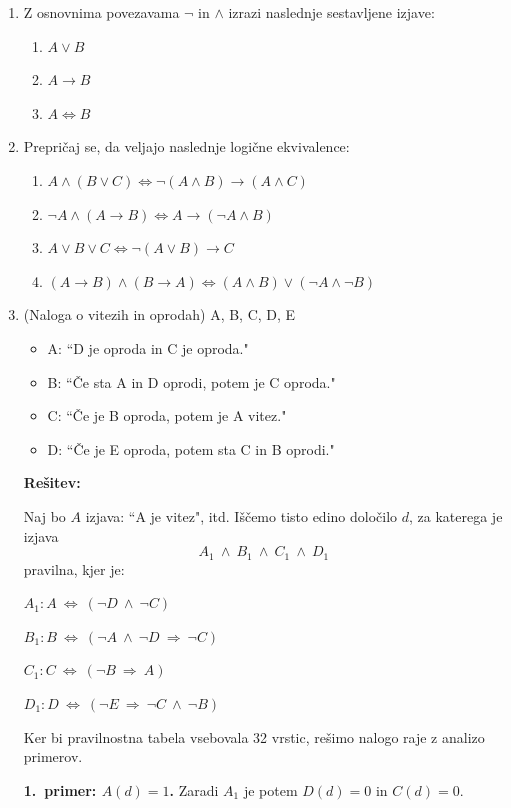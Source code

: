 \documentclass[11pt,paper=b5,DIV=13,headinclude,footinclude]{scrbook}
\def\inn {{~\wedge~}}
\def\sledi {{~\Rightarrow~}}
\def\cee {{~\Leftrightarrow~}}
\begin{document}
\begin{enumerate}
\item Z osnovnima povezavama $\neg$ in $\land$ izrazi naslednje sestavljene izjave:
\begin{enumerate}
  \item $A \lor B$
  \item $A \rightarrow B$
  \item $A \iff B$
\end{enumerate}

\item Prepričaj se, da veljajo naslednje logične ekvivalence:
\begin{enumerate}
  \item $A \land (B \lor C) \iff \neg (A \land B) \rightarrow (A \land C)$
  \item $\neg A \land (A \rightarrow B) \iff A \rightarrow (\neg A \land B)$
  \item $A \lor B \lor C \iff \neg (A \lor B) \rightarrow C$
  \item $(A \rightarrow B) \land (B \rightarrow A) \iff (A \land B) \lor (\neg A \land \neg B)$
\end{enumerate}

    \item 
    (Naloga o vitezih in oprodah)
A, B, C, D, E
\begin{itemize}
  \item A: ``D je oproda in C je oproda."
  \item B: ``Če sta A in D oprodi, potem je C oproda."
  \item C: ``Če je B oproda, potem je A vitez."
  \item D: ``Če je E oproda, potem sta C in B oprodi."
\end{itemize}

\medskip
\textbf{Rešitev:}

Naj bo $A$ izjava: ``A je vitez", itd.
Iščemo tisto edino določilo $d$, za katerega je izjava $$A_1\inn B_1\inn C_1\inn D_1$$
pravilna, kjer je:

$A_1: A\cee (\neg D \inn \neg C)$

$B_1: B\cee (\neg A \inn \neg D\sledi \neg C)$

$C_1: C\cee (\neg B \sledi A)$

$D_1: D\cee (\neg E \sledi \neg C \inn \neg B)$


Ker bi pravilnostna tabela vsebovala 32 vrstic, rešimo nalogo
raje z analizo primerov.

\textbf{1.~primer: $A(d) = 1$.}
Zaradi $A_1$ je potem $D(d) = 0$ in $C(d) = 0$.


\end{enumerate}
\end{document}
